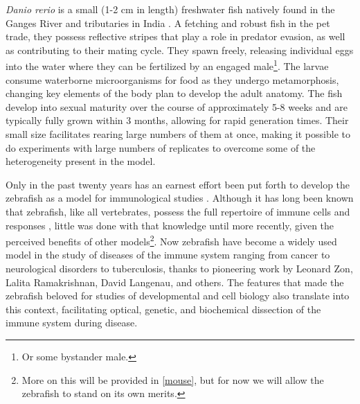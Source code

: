 \textit{Danio rerio} is a small (1\hyp{}2 cm in length) freshwater fish natively found in the Ganges River and tributaries in India \citep{Engeszer2007, Arunachalam2013, Parichy2015}. A fetching and robust fish in the pet trade, they possess reflective stripes that play a role in predator evasion, as well as contributing to their mating cycle. They spawn freely, releasing individual eggs into the water where they can be fertilized by an engaged male\footnote{Or some bystander male.}. The larvae consume waterborne microorganisms for food as they undergo metamorphosis, changing key elements of the body plan to develop the adult anatomy. The fish develop into sexual maturity over the course of approximately 5\hyp{}8 weeks and are typically fully grown within 3 months, allowing for rapid generation times. Their small size facilitates rearing large numbers of them at once, making it possible to do experiments with large numbers of replicates to overcome some of the heterogeneity present in the model.

Only in the past twenty years has an earnest effort been put forth to develop the zebrafish as a model for immunological studies \citep{Davis2002, Langenau2003, Hsu2004}. Although it has long been known that zebrafish, like all vertebrates, possess the full repertoire of immune cells and responses \citep{Liongue2009, LugoVillarino2010}, little was done with that knowledge until more recently, given the perceived benefits of other models\footnote{More on this will be provided in \autoref{mouse}, but for now we will allow the zebrafish to stand on its own merits.}. Now zebrafish have become a widely used model in the study of diseases of the immune system ranging from cancer to neurological disorders to tuberculosis, thanks to pioneering work by Leonard Zon, Lalita Ramakrishnan, David Langenau, and others. The features that made the zebrafish beloved for studies of developmental and cell biology also translate into this context, facilitating optical, genetic, and biochemical dissection of the immune system during disease.

